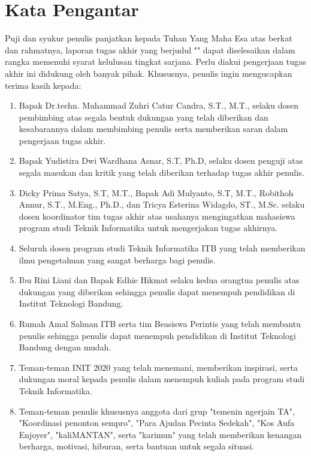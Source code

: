\chapter*{Kata Pengantar}

Puji dan syukur penulis panjatkan kepada Tuhan Yang Maha Esa atas berkat dan rahmatnya, laporan tugas akhir yang berjudul "\thetitle" dapat diselesaikan dalam rangka memenuhi syarat kelulusan tingkat sarjana. Perlu diakui pengerjaan tugas akhir ini didukung oleh banyak pihak. Khususnya, penulis ingin mengucapkan terima kasih kepada:

\begin{enumerate}
  \item Bapak Dr.techn. Muhammad Zuhri Catur Candra, S.T., M.T., selaku dosen pembimbing atas segala bentuk dukungan yang telah diberikan dan kesabarannya dalam membimbing penulis serta memberikan saran dalam pengerjaan tugas akhir.
  \item Bapak Yudistira Dwi Wardhana Asnar, S.T, Ph.D, selaku dosen penguji atas segala masukan dan kritik yang telah diberikan terhadap tugas akhir penulis.
  \item Dicky Prima Satya, S.T, M.T., Bapak Adi Mulyanto, S.T, M.T., Robithoh Annur, S.T., M.Eng., Ph.D., dan Tricya Esterina Widagdo, ST., M.Sc. selaku dosen koordinator tim tugas akhir atas usahanya mengingatkan mahasiswa program studi Teknik Informatika untuk mengerjakan tugas akhirnya.
  \item Seluruh dosen program studi Teknik Informatika ITB yang telah memberikan ilmu pengetahuan yang sangat berharga bagi penulis.
  \item Ibu Rini Liani dan Bapak Edhie Hikmat selaku kedua orangtua penulis atas dukungan yang diberikan sehingga penulis dapat menempuh pendidikan di Institut Teknologi Bandung.
  \item Rumah Amal Salman ITB serta tim Beasiswa Perintis yang telah membantu penulis sehingga penulis dapat menempuh pendidikan di Institut Teknologi Bandung dengan mudah.
  \item Teman-teman INIT 2020 yang telah menemani, memberikan inspirasi, serta dukungan moral kepada penulis dalam menempuh kuliah pada program studi Teknik Informatika.
  \item Teman-teman penulis khususnya anggota dari grup "temenin ngerjain TA", "Koordinasi penonton sempro", "Para Ajudan Pecinta Sedekah", "Kos Aufa Enjoyer", "kaliMANTAN", serta "karimun" yang telah memberikan kenangan berharga, motivasi, hiburan, serta bantuan untuk segala situasi.

\end{enumerate}
